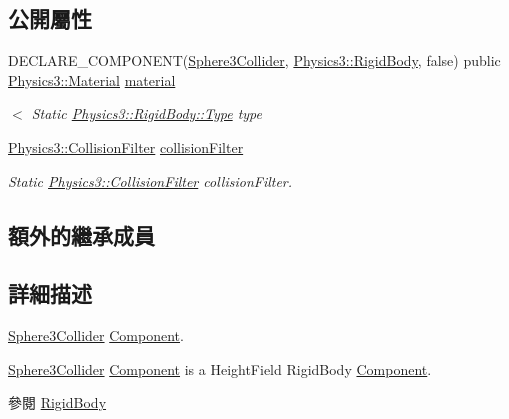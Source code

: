 \subsection*{公開屬性}
\begin{DoxyCompactItemize}
\item 
D\+E\+C\+L\+A\+R\+E\+\_\+\+C\+O\+M\+P\+O\+N\+E\+NT(\hyperlink{class_magnum_1_1_sphere3_collider}{Sphere3\+Collider}, \hyperlink{class_magnum_1_1_physics3_1_1_rigid_body}{Physics3\+::\+Rigid\+Body}, false) public \hyperlink{class_magnum_1_1_physics3_1_1_material}{Physics3\+::\+Material} \hyperlink{class_magnum_1_1_sphere3_collider_a5ebf40b1db0f493fef8119a833089a62}{material}
\begin{DoxyCompactList}\small\item\em $<$ Static \hyperlink{class_magnum_1_1_physics3_1_1_rigid_body_a429aa4fb7256b083334c86cdcd0d6b31}{Physics3\+::\+Rigid\+Body\+::\+Type} type \end{DoxyCompactList}\item 
\hyperlink{class_magnum_1_1_physics3_1_1_collision_filter}{Physics3\+::\+Collision\+Filter} \hyperlink{class_magnum_1_1_sphere3_collider_a6b055a1cdc756e58b4526df2313ba159}{collision\+Filter}\hypertarget{class_magnum_1_1_sphere3_collider_a6b055a1cdc756e58b4526df2313ba159}{}\label{class_magnum_1_1_sphere3_collider_a6b055a1cdc756e58b4526df2313ba159}

\begin{DoxyCompactList}\small\item\em Static \hyperlink{class_magnum_1_1_physics3_1_1_collision_filter}{Physics3\+::\+Collision\+Filter} collision\+Filter. \end{DoxyCompactList}\end{DoxyCompactItemize}
\subsection*{額外的繼承成員}


\subsection{詳細描述}
\hyperlink{class_magnum_1_1_sphere3_collider}{Sphere3\+Collider} \hyperlink{class_magnum_1_1_component}{Component}. 

\hyperlink{class_magnum_1_1_sphere3_collider}{Sphere3\+Collider} \hyperlink{class_magnum_1_1_component}{Component} is a Height\+Field Rigid\+Body \hyperlink{class_magnum_1_1_component}{Component}. \begin{DoxySeeAlso}{參閱}
\hyperlink{class_magnum_1_1_physics3_1_1_rigid_body_a2327744d90c049296ea0d63b3e64d335}{Rigid\+Body} 
\end{DoxySeeAlso}


